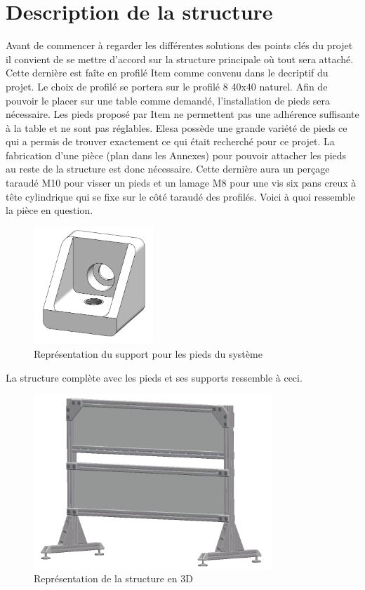 \section{Description de la structure}\label{sec:DescStruct}
Avant de commencer à regarder les différentes solutions des points clés du projet il convient de se mettre d'accord
sur la structure principale où tout sera attaché. Cette dernière est faîte en profilé Item \cite{Item} comme convenu dans le decriptif
du projet. Le choix de profilé se portera sur le profilé 8 40x40 naturel. Afin de pouvoir le placer sur une table comme demandé, l'installation de pieds sera nécessaire. Les pieds proposé par Item ne
permettent pas une adhérence suffisante à la table et ne sont pas réglables. Elesa \cite{Elesa} possède une grande variété de pieds ce qui
a permis de trouver exactement ce qui était recherché pour ce projet. La fabrication d'une pièce (plan dans les Annexes) pour pouvoir attacher
les pieds au reste de la structure est donc nécessaire. Cette dernière aura un perçage taraudé M10 pour visser un pieds et un lamage M8 pour
une vis six pans creux à tête cylindrique qui se fixe sur le côté taraudé des profilés. Voici à quoi ressemble la pièce en question.

\begin{figure}[H]
  \centering
  \includegraphics[width = 0.4\textwidth]{assets/figures/SupportPieds.png}
  \caption{Représentation du support pour les pieds du système}
  \label{fig:SupPieds}
\end{figure}

La structure complète avec les pieds et ses supports ressemble à ceci.
\begin{figure}[H]
  \centering
  \includegraphics[width = 0.8\textwidth]{assets/figures/Structure.png}
  \caption{Représentation de la structure en 3D}
  \label{fig:DescStruct}
\end{figure}

